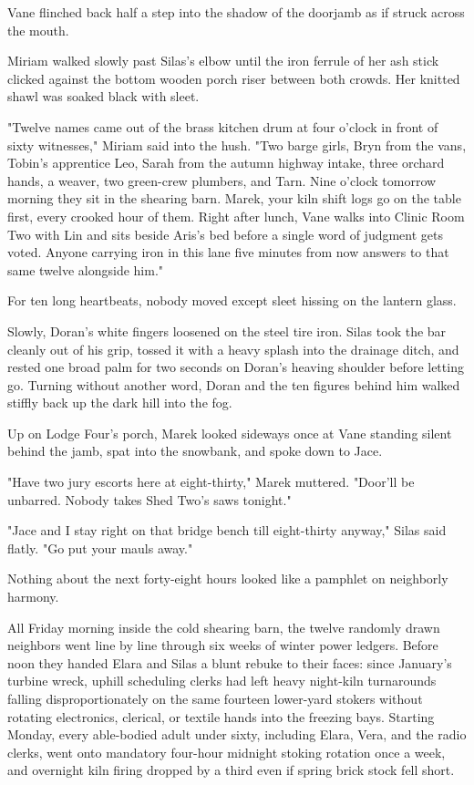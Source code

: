 Vane flinched back half a step into the shadow of the doorjamb as if struck across the mouth.

Miriam walked slowly past Silas's elbow until the iron ferrule of her ash stick clicked against the bottom wooden porch riser between both crowds. Her knitted shawl was soaked black with sleet.

"Twelve names came out of the brass kitchen drum at four o'clock in front of sixty witnesses," Miriam said into the hush. "Two barge girls, Bryn from the vans, Tobin's apprentice Leo, Sarah from the autumn highway intake, three orchard hands, a weaver, two green-crew plumbers, and Tarn. Nine o'clock tomorrow morning they sit in the shearing barn. Marek, your kiln shift logs go on the table first, every crooked hour of them. Right after lunch, Vane walks into Clinic Room Two with Lin and sits beside Aris's bed before a single word of judgment gets voted. Anyone carrying iron in this lane five minutes from now answers to that same twelve alongside him."

For ten long heartbeats, nobody moved except sleet hissing on the lantern glass.

Slowly, Doran's white fingers loosened on the steel tire iron. Silas took the bar cleanly out of his grip, tossed it with a heavy splash into the drainage ditch, and rested one broad palm for two seconds on Doran's heaving shoulder before letting go. Turning without another word, Doran and the ten figures behind him walked stiffly back up the dark hill into the fog.

Up on Lodge Four's porch, Marek looked sideways once at Vane standing silent behind the jamb, spat into the snowbank, and spoke down to Jace.

"Have two jury escorts here at eight-thirty," Marek muttered. "Door'll be unbarred. Nobody takes Shed Two's saws tonight."

"Jace and I stay right on that bridge bench till eight-thirty anyway," Silas said flatly. "Go put your mauls away."

\bigskip

Nothing about the next forty-eight hours looked like a pamphlet on neighborly harmony.

All Friday morning inside the cold shearing barn, the twelve randomly drawn neighbors went line by line through six weeks of winter power ledgers. Before noon they handed Elara and Silas a blunt rebuke to their faces: since January's turbine wreck, uphill scheduling clerks had left heavy night-kiln turnarounds falling disproportionately on the same fourteen lower-yard stokers without rotating electronics, clerical, or textile hands into the freezing bays. Starting Monday, every able-bodied adult under sixty, including Elara, Vera, and the radio clerks, went onto mandatory four-hour midnight stoking rotation once a week, and overnight kiln firing dropped by a third even if spring brick stock fell short.

